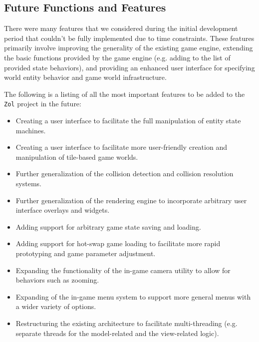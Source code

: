 \documentclass{article}
\newcommand{\projectname}[0] {\texttt{Zol} }
\begin{document}
		\subsection[Features]{Future Functions and Features}
		There were many features that we considered during the initial development
		period that couldn't be fully implemented due to time constraints.  These
		features primarily involve improving the generality of the existing game
		engine, extending the basic functions provided by the game engine (e.g.
		adding to the list of provided state behaviors), and providing an enhanced
		user interface for specifying world entity behavior and game world
		infrastructure.

		The following is a listing of all the most important features to be added
		to the \projectname project in the future:

		\begin{itemize}
			\item Creating a user interface to facilitate the full manipulation
			of entity state machines.

			\item Creating a user interface to facilitate more user-friendly
			creation and manipulation of tile-based game worlds.

			\item Further generalization of the collision detection and collision
			resolution systems.

			\item Further generalization of the rendering engine to incorporate
			arbitrary user interface overlays and widgets.

			\item Adding support for arbitrary game state saving and loading.

			\item Adding support for hot-swap game loading to facilitate more
			rapid prototyping and game parameter adjustment.

			\item Expanding the functionality of the in-game camera utility to
			allow for behaviors such as zooming.

			\item Expanding of the in-game menu system to support more general
			menus with a wider variety of options.

			\item Restructuring the existing architecture to facilitate
			multi-threading (e.g. separate threads for the model-related and
			the view-related logic).
		\end{itemize}
\end{document}
